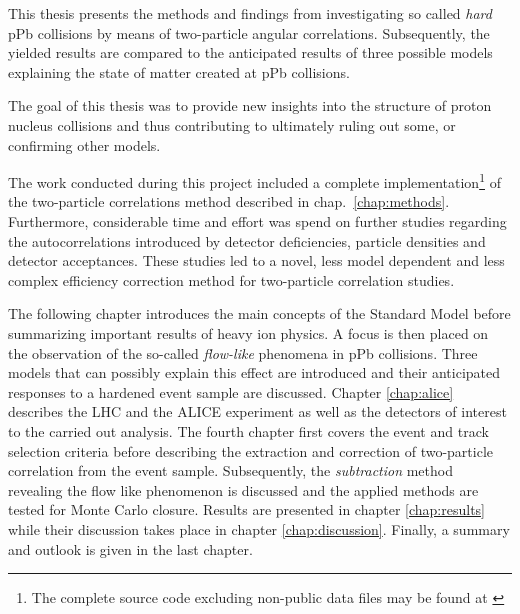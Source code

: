 This thesis presents the methods and findings from investigating so called \emph{hard} pPb collisions by means of two-particle angular correlations. Subsequently, the yielded results are compared to the anticipated results of three possible models explaining the state of matter created at pPb collisions.

The goal of this thesis was to provide new insights into the structure of proton nucleus collisions and thus contributing to ultimately ruling out some, or confirming other models.

The work conducted during this project included a complete implementation\footnote{The complete source code excluding non-public data files may be found at \cite{Bourjau2014}} of the two-particle correlations method described in chap.~\ref{chap:methods}. Furthermore, considerable time and effort was spend on further studies regarding the autocorrelations introduced by detector deficiencies, particle densities and detector acceptances. These studies led to a novel, less model dependent and less complex efficiency correction method for two-particle correlation studies.

The following chapter introduces the main concepts of the Standard Model before summarizing important results of heavy ion physics. A focus is then placed on the observation of the so-called \emph{flow-like} phenomena in pPb collisions. Three models that can possibly explain this effect are introduced and their anticipated responses to a hardened event sample are discussed. Chapter \ref{chap:alice} describes the LHC and the ALICE experiment as well as the detectors of interest to the carried out analysis. The fourth chapter first covers the event and track selection criteria before describing the extraction and correction of two-particle correlation from the event sample. Subsequently, the \emph{subtraction} method revealing the flow like phenomenon is discussed and the applied methods are tested for Monte Carlo closure. Results are presented in chapter \ref{chap:results} while their discussion takes place in chapter \ref{chap:discussion}. Finally, a summary and outlook is given in the last chapter.




